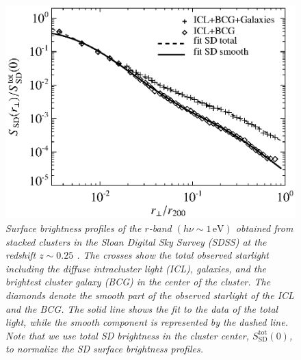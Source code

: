\documentclass[10pt,aps,pra,reprint,amsmath,amsfonts,amssymb,showpacs,nofootinbib,floatfix]{revtex4-1}
\newcommand{\rmn}{\mathrm}
\newcommand{\sd}{\rmn{SD}}
\newcommand{\ev}{\rmn{eV}}
\begin{document}
\begin{figure}%
 \includegraphics[width=0.99\columnwidth]{figures/SB.photon.eps}
 \caption{\it Surface brightness profiles of the $r$-band $(h\nu\sim
   1\,\ev)$ obtained from stacked clusters in the Sloan Digital Sky
   Survey (SDSS) at the redshift $z \sim 0.25$ \protect
   \cite{2005MNRAS.358..949Z}. The crosses show the total observed
   starlight including the diffuse intracluster light (ICL), galaxies,
   and the brightest cluster galaxy (BCG) in the center of the
   cluster. The diamonds denote the smooth part of the observed
   starlight of the ICL and the BCG. The solid line shows the fit to
   the data of the total light, while the smooth component is
   represented by the dashed line. Note that we use total SD
   brightness in the cluster center, $S_\sd^\rmn{tot}(0)$, to
   normalize the SD surface brightness profiles.}
 \label{fig:SD_spatial}
\end{figure}
\end{document}
